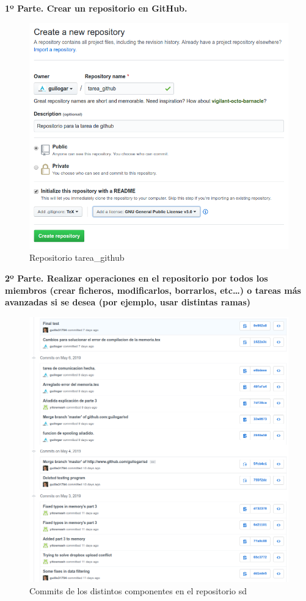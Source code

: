 \documentclass{article}
\title{}
\author{
Guillermo López García
\and
Guillermo Girón García
\and
Teodoro Martínez Márquez
}
\begin{document}
\maketitle

\textbf{1º Parte. Crear un repositorio en GitHub.}\\
\begin{figure}[H]
\centering
\includegraphics[width=0.7\linewidth]{./1_1}
\caption{Repositorio tarea\_github}
\end{figure}

\textbf{2º Parte. Realizar operaciones en el repositorio por todos los miembros (crear ficheros, modificarlos, borrarlos, etc\ldots) o tareas más avanzadas si se desea (por ejemplo, usar distintas ramas)}\\

\begin{figure}[H]
\centering
\includegraphics[width=0.7\linewidth]{./2_1}
\caption{Commits de los distintos componentes en el repositorio sd}
\end{figure}
\end{document}
